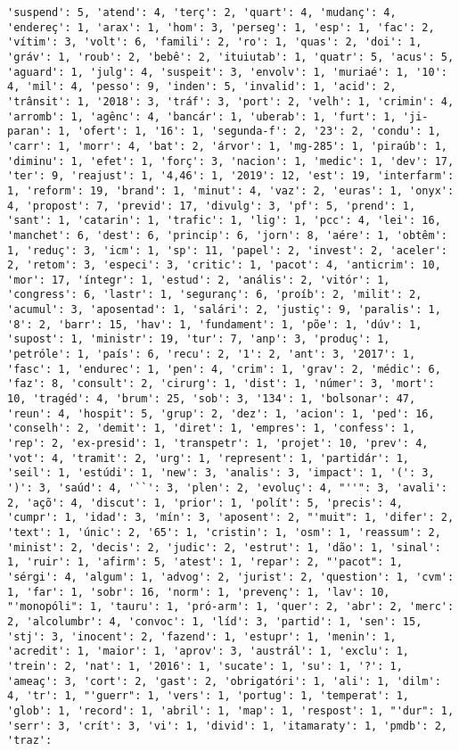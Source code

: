 \documentclass[11pt]{article}
\begin{document}
\begin{Verbatim}[commandchars=\\\{\}]
'suspend': 5, 'atend': 4, 'terç': 2, 'quart': 4, 'mudanç': 4, 'endereç': 1, 'arax': 1, 'hom': 3, 'perseg': 1, 'esp': 1, 'fac': 2, 'vítim': 3, 'volt': 6, 'famili': 2, 'ro': 1, 'quas': 2, 'doi': 1, 'gráv': 1, 'roub': 2, 'bebê': 2, 'ituiutab': 1, 'quatr': 5, 'acus': 5, 'aguard': 1, 'julg': 4, 'suspeit': 3, 'envolv': 1, 'muriaé': 1, '10': 4, 'mil': 4, 'pesso': 9, 'inden': 5, 'invalid': 1, 'acid': 2, 'trânsit': 1, '2018': 3, 'tráf': 3, 'port': 2, 'velh': 1, 'crimin': 4, 'arromb': 1, 'agênc': 4, 'bancár': 1, 'uberab': 1, 'furt': 1, 'ji-paran': 1, 'ofert': 1, '16': 1, 'segunda-f': 2, '23': 2, 'condu': 1, 'carr': 1, 'morr': 4, 'bat': 2, 'árvor': 1, 'mg-285': 1, 'piraúb': 1, 'diminu': 1, 'efet': 1, 'forç': 3, 'nacion': 1, 'medic': 1, 'dev': 17, 'ter': 9, 'reajust': 1, '4,46': 1, '2019': 12, 'est': 19, 'interfarm': 1, 'reform': 19, 'brand': 1, 'minut': 4, 'vaz': 2, 'euras': 1, 'onyx': 4, 'propost': 7, 'previd': 17, 'divulg': 3, 'pf': 5, 'prend': 1, 'sant': 1, 'catarin': 1, 'trafic': 1, 'lig': 1, 'pcc': 4, 'lei': 16, 'manchet': 6, 'dest': 6, 'princip': 6, 'jorn': 8, 'aére': 1, 'obtêm': 1, 'reduç': 3, 'icm': 1, 'sp': 11, 'papel': 2, 'invest': 2, 'aceler': 2, 'retom': 3, 'especi': 3, 'critic': 1, 'pacot': 4, 'anticrim': 10, 'mor': 17, 'íntegr': 1, 'estud': 2, 'anális': 2, 'vitór': 1, 'congress': 6, 'lastr': 1, 'seguranç': 6, 'proíb': 2, 'milit': 2, 'acumul': 3, 'aposentad': 1, 'salári': 2, 'justiç': 9, 'paralis': 1, '8': 2, 'barr': 15, 'hav': 1, 'fundament': 1, 'põe': 1, 'dúv': 1, 'supost': 1, 'ministr': 19, 'tur': 7, 'anp': 3, 'produç': 1, 'petróle': 1, 'país': 6, 'recu': 2, '1': 2, 'ant': 3, '2017': 1, 'fasc': 1, 'endurec': 1, 'pen': 4, 'crim': 1, 'grav': 2, 'médic': 6, 'faz': 8, 'consult': 2, 'cirurg': 1, 'dist': 1, 'númer': 3, 'mort': 10, 'tragéd': 4, 'brum': 25, 'sob': 3, '134': 1, 'bolsonar': 47, 'reun': 4, 'hospit': 5, 'grup': 2, 'dez': 1, 'acion': 1, 'ped': 16, 'conselh': 2, 'demit': 1, 'diret': 1, 'empres': 1, 'confess': 1, 'rep': 2, 'ex-presid': 1, 'transpetr': 1, 'projet': 10, 'prev': 4, 'vot': 4, 'tramit': 2, 'urg': 1, 'represent': 1, 'partidár': 1, 'seil': 1, 'estúdi': 1, 'new': 3, 'analis': 3, 'impact': 1, '(': 3, ')': 3, 'saúd': 4, '``': 3, 'plen': 2, 'evoluç': 4, "''": 3, 'avali': 2, 'açõ': 4, 'discut': 1, 'prior': 1, 'polít': 5, 'precis': 4, 'cumpr': 1, 'idad': 3, 'mín': 3, 'aposent': 2, "'muit": 1, 'difer': 2, 'text': 1, 'únic': 2, '65': 1, 'cristin': 1, 'osm': 1, 'reassum': 2, 'minist': 2, 'decis': 2, 'judic': 2, 'estrut': 1, 'dão': 1, 'sinal': 1, 'ruir': 1, 'afirm': 5, 'atest': 1, 'repar': 2, "'pacot": 1, 'sérgi': 4, 'algum': 1, 'advog': 2, 'jurist': 2, 'question': 1, 'cvm': 1, 'far': 1, 'sobr': 16, 'norm': 1, 'prevenç': 1, 'lav': 10, "'monopóli": 1, 'tauru': 1, 'pró-arm': 1, 'quer': 2, 'abr': 2, 'merc': 2, 'alcolumbr': 4, 'convoc': 1, 'líd': 3, 'partid': 1, 'sen': 15, 'stj': 3, 'inocent': 2, 'fazend': 1, 'estupr': 1, 'menin': 1, 'acredit': 1, 'maior': 1, 'aprov': 3, 'austrál': 1, 'exclu': 1, 'trein': 2, 'nat': 1, '2016': 1, 'sucate': 1, 'su': 1, '?': 1, 'ameaç': 3, 'cort': 2, 'gast': 2, 'obrigatóri': 1, 'ali': 1, 'dilm': 4, 'tr': 1, "'guerr": 1, 'vers': 1, 'portug': 1, 'temperat': 1, 'glob': 1, 'record': 1, 'abril': 1, 'map': 1, 'respost': 1, "'dur": 1, 'serr': 3, 'crít': 3, 'vi': 1, 'divid': 1, 'itamaraty': 1, 'pmdb': 2, 'traz': 
\end{Verbatim}
\end{document}
